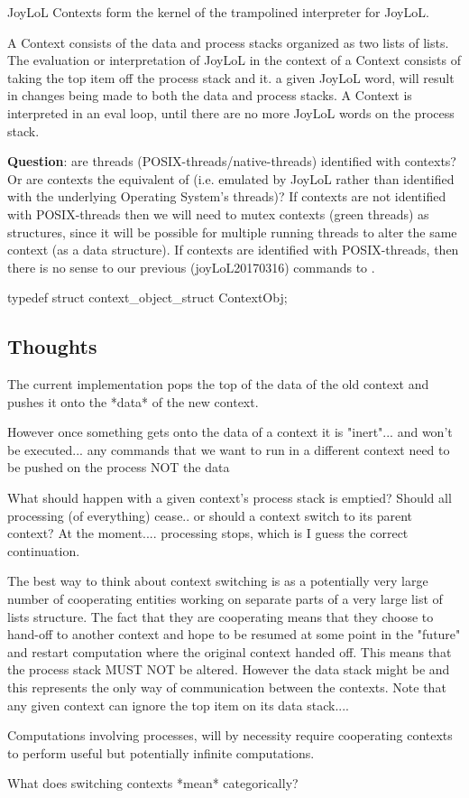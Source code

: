 
\startsection[title=Goals]

JoyLoL Contexts form the kernel of the trampolined interpreter for JoyLoL. 

A Context consists of the data and process stacks organized as two lists 
of lists. The evaluation or interpretation of JoyLoL in the context of a 
Context consists of taking the top item off the process stack and 
 it.  a given JoyLoL word, will result 
in changes being made to both the data and process stacks. A Context is 
interpreted in an eval loop, until there are no more JoyLoL words on the 
process stack. 

{\bf Question}: are threads (POSIX-threads/native-threads) identified with 
contexts? Or are contexts the equivalent of  (i.e. 
 emulated by JoyLoL rather than identified with the 
underlying Operating System's threads)? If contexts are not identified 
with POSIX-threads then we will need to mutex contexts (green threads) as 
 structures, since it will be possible for multiple running 
threads to alter the same context (as a data structure). If contexts are 
identified with POSIX-threads, then there is no sense to our previous 
(joyLoL20170316) commands to . 

\startCHeader
typedef struct context_object_struct ContextObj;
\stopCHeader

\subsection{Thoughts}

The current implementation pops the top of the data of the old context and 
pushes it onto the *data* of the new context. 

However once something gets onto the data of a context it is "inert"... 
and won't be executed... any commands that we want to run in a different 
context need to be pushed on the process NOT the data 

What should happen with a given context's process stack is emptied? Should 
all processing (of everything) cease.. or should a context switch to its 
parent context? At the moment.... processing stops, which is I guess the 
correct continuation. 

The best way to think about context switching is as a potentially very 
large number of cooperating entities working on separate parts of a very 
large list of lists structure. The fact that they are cooperating means 
that they choose to hand-off to another context and hope to be resumed at 
some point in the "future" and restart computation where the original 
context handed off. This means that the process stack MUST NOT be altered. 
However the data stack might be and this represents the only way of 
communication between the contexts. Note that any given context can ignore 
the top item on its data stack.... 

Computations involving processes, will by necessity require cooperating 
contexts to perform useful but potentially infinite computations. 

What does switching contexts *mean* categorically?